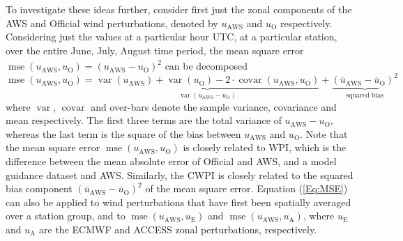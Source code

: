 \documentclass{ametsoc}
\DeclareMathOperator{\mse}{mse}
\DeclareMathOperator{\covar}{covar}
\DeclareMathOperator{\var}{var}
\begin{document}
To investigate these ideas further, consider first just the zonal components of the AWS and Official wind perturbations, denoted by $u_\text{AWS}$ and $u_\text{O}$ respectively. Considering just the values at a particular hour UTC, at a particular station, over the entire June, July, August time period, the mean square error  $\mse\left(u_\text{AWS}, u_\text{O}\right) = \overline{\left(u_\text{AWS} - u_\text{O}\right)^2}$ can be decomposed
\begin{equation}
\mse\left(u_\text{AWS}, u_\text{O}\right) = \underbrace{\var\left(u_\text{AWS}\right) + \var\left(u_\text{O}\right) - 2 \cdot \covar\left(u_\text{AWS}, u_\text{O}\right)}_{\var\left(u_\text{AWS} - u_\text{O}\right)} + \underbrace{\left(\overline{u}_\text{AWS} - \overline{u}_\text{O}\right)^2}_{\text{squared bias}} \label{Eq:MSE}
\end{equation}
where $\var$, $\covar$ and over-bars denote the sample variance, covariance and mean respectively. The first three terms are the total variance of $u_\text{AWS} - u_\text{O}$, whereas the last term is the square of the bias between $u_\text{AWS}$ and $u_\text{O}$. Note that the mean square error $\mse\left(u_\text{AWS}, u_\text{O}\right)$ is closely related to $\overline{\text{WPI}}$, which is the difference between the mean absolute error of Official and AWS, and a model guidance dataset and AWS. Similarly, the CWPI is closely related to the squared bias component $\left(\overline{u}_\text{AWS} - \overline{u}_\text{O}\right)^2$ of the mean square error. Equation (\ref{Eq:MSE}) can also be applied to wind perturbations that have first been spatially averaged over a station group, and to $\mse\left(u_\text{AWS}, u_\text{E}\right)$ and $\mse\left(u_\text{AWS}, u_\text{A}\right)$, where $u_\text{E}$ and $u_\text{A}$ are the ECMWF and ACCESS zonal perturbations, respectively. 
\end{document}
